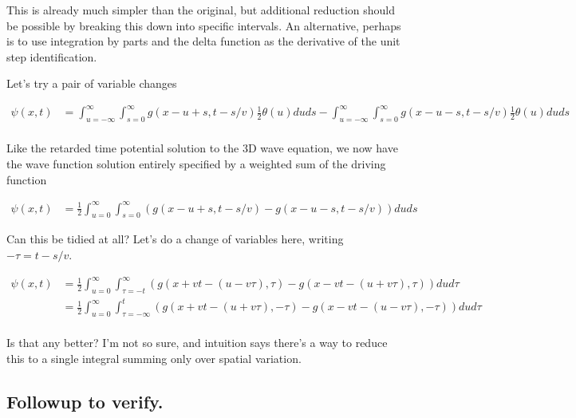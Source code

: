 This is already much simpler than the original, but additional reduction should be possible by breaking this down into specific intervals.  An
alternative, perhaps is to use integration by parts and the delta function as the derivative of the unit step identification.

Let's try a pair of variable changes

\begin{align*}
{\psi}(x, t)
&=
\int_{u=-\infty}^\infty
\int_{s= 0}^\infty
{g}(x-u+s, t-s/v)
\frac{1}{2} \theta(u ) 
du ds
-\int_{u=-\infty}^\infty
\int_{s= 0}^\infty
{g}(x-u -s, t-s/v)
\frac{1}{2} \theta(u) 
du ds \\
\end{align*}

Like the retarded time potential solution to the 3D wave equation, we now have the wave function solution entirely specified by a
weighted sum of the driving function

\begin{align}
{\psi}(x, t)
&=
\frac{1}{2}
\int_{u = 0}^\infty
\int_{s = 0}^\infty
\left( {g}(x-u+s, t-s/v) - {g}(x-u -s, t-s/v) \right)
du ds
\end{align}

Can this be tidied at all?  Let's do a change of variables here, writing $-\tau = t -s/v$.

%
%
% 
\begin{align*}
{\psi}(x, t)
&=
\frac{1}{2}
\int_{u = 0}^\infty
\int_{\tau = -t}^\infty
\left( {g}(x+vt -(u - v\tau), \tau) - {g}(x-v t -(u +v\tau), \tau) \right)
du d\tau \\
&=
\frac{1}{2}
\int_{u = 0}^\infty
\int_{\tau = -\infty}^{t}
\left( {g}(x+vt -(u + v\tau), -\tau) - {g}(x-v t -(u -v\tau), -\tau) \right)
du d\tau \\
\end{align*}

Is that any better?  I'm not so sure, and intuition says there's a way to reduce this to a single integral summing
only over spatial variation.

\subsection{Followup to verify. }

